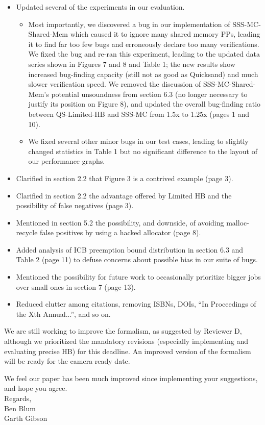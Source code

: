 \documentclass{article}
\begin{document}
\begin{itemize}
	\item Updated several of the experiments in our evaluation.
		\begin{itemize}
			\item Most importantly, we discovered a bug in our implementation of SSS-MC-Shared-Mem which caused it to ignore many shared memory PPs, leading it to find far too few bugs and erroneously declare too many verifications.
		We fixed the bug and re-ran this experiment, leading to the updated data series shown in Figures 7 and 8 and Table 1;
		the new results show increased bug-finding capacity (still not as good as Quicksand) and much slower verification speed.
		We removed the discussion of SSS-MC-Shared-Mem's potential unsoundness from section 6.3 (no longer necessary to justify its position on Figure 8),
		and updated the overall bug-finding ratio between QS-Limited-HB and SSS-MC from 1.5x to 1.25x (pages 1 and 10).
			\item We fixed several other minor bugs in our test cases, leading to slightly changed statistics in Table 1 but no significant difference to the layout of our performance graphs.
		\end{itemize}
	\item Clarified in section 2.2 that Figure 3 is a contrived example (page 3).
	\item Clarified in section 2.2 the advantage offered by Limited HB and the possibility of false negatives (page 3).
	\item Mentioned in section 5.2 the possibility, and downside, of avoiding malloc-recycle false positives by using a hacked allocator (page 8).
	\item Added analysis of ICB preemption bound distribution in section 6.3 and Table 2 (page 11) to defuse concerns about possible bias in our suite of bugs.
	\item Mentioned the possibility for future work to occasionally prioritize bigger jobs over small ones in section 7 (page 13).
	\item Reduced clutter among citations, removing ISBNs, DOIs, ``In Proceedings of the Xth Annual...'', and so on.
\end{itemize}

We are still working to improve the formalism, as suggested by Reviewer D,
although we prioritized the mandatory revisions (especially implementing and evaluating precise HB) for this deadline.
An improved version of the formalism will be ready for the camera-ready date.

We feel our paper has been much improved since implementing your suggestions, and hope you agree.
\\

\noindent Regards,
\\

\noindent Ben Blum \\
Garth Gibson
\thispagestyle{empty}
\end{document}
